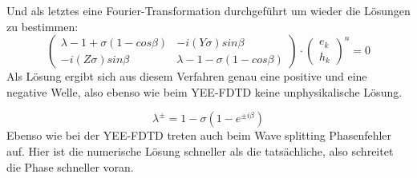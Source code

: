 Und als letztes eine Fourier-Transformation durchgef\"uhrt um wieder die L\"osungen zu bestimmen:
\begin{equation*}
	\begin{pmatrix}
		\lambda - 1 + \sigma(1-cos\beta) & -i(Y\sigma)sin\beta \\
		-i(Z\sigma)sin\beta & \lambda -1 - \sigma(1-cos\beta)
	\end{pmatrix}
	\cdot
	\begin{pmatrix}
		e_k\\
		h_k
	\end{pmatrix}^n
	=
	0
\end{equation*}
Als L\"osung ergibt sich aus diesem Verfahren genau eine positive und eine negative Welle, also ebenso wie beim YEE-FDTD keine unphysikalische L\"osung.
\par
\begin{equation*}
	\lambda^\pm = 1-\sigma(1-e^{\pm i\beta})
\end{equation*}
Ebenso wie bei der YEE-FDTD treten auch beim Wave splitting Phasenfehler auf. Hier ist die numerische L\"osung schneller als die tats\"achliche, also schreitet die Phase schneller voran.

